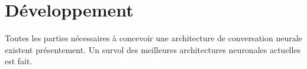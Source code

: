 \section{Développement}
Toutes les parties nécessaires à concevoir une architecture de conversation neurale existent présentement. Un survol des meilleures architectures neuronales actuelles est fait.






